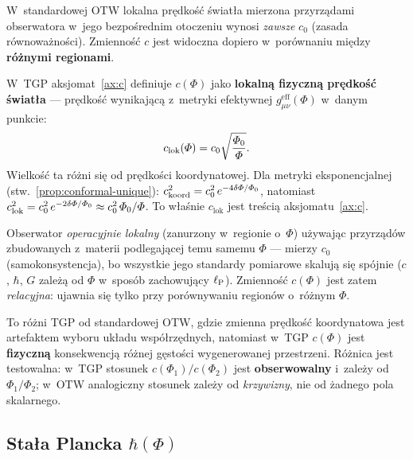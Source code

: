 \begin{remark}\label{rem:c-interpretacja}
W~standardowej OTW lokalna pr\k{e}dko\'s\'c \'swiat\l{}a
mierzona przyrz\k{a}dami obserwatora w~jego bezpo\'srednim
otoczeniu wynosi \emph{zawsze} $c_0$ (zasada r\'ownowa\.zno\'sci).
Zmienno\'s\'c $c$ jest widoczna dopiero w~por\'ownaniu
mi\k{e}dzy \textbf{r\'o\.znymi regionami}.

W~TGP aksjomat~\ref{ax:c} definiuje $c(\Phi)$ jako
\textbf{lokaln\k{a} fizyczn\k{a} pr\k{e}dko\'s\'c \'swiat\l{}a}
--- pr\k{e}dko\'s\'c wynikaj\k{a}c\k{a} z~metryki efektywnej
$g_{\mu\nu}^{\mathrm{eff}}(\Phi)$ w~danym punkcie:
\begin{equation}\label{eq:c-lok}
    c_{\mathrm{lok}}(\varPhi)
    = c_0\sqrt{\frac{\varPhi_0}{\varPhi}}.
\end{equation}
Wielko\'s\'c ta r\'o\.zni si\k{e} od pr\k{e}dko\'sci
koordynatowej. Dla metryki eksponencjalnej
(stw.~\ref{prop:conformal-unique}):
$c_{\mathrm{koord}}^2 = c_0^2\,e^{-4\delta\varPhi/\varPhi_0}$,
natomiast $c_{\mathrm{lok}}^2 = c_0^2\,e^{-2\delta\varPhi/\varPhi_0}
\approx c_0^2\,\varPhi_0/\varPhi$.
To w\l{}a\'snie $c_{\mathrm{lok}}$ jest tre\'sci\k{a}
aksjomatu~\ref{ax:c}.

Obserwator \emph{operacyjnie lokalny} (zanurzony w~regionie o~$\Phi$)
u\.zywaj\k{a}c przyrz\k{a}d\'ow zbudowanych z~materii
podlegaj\k{a}cej temu samemu $\Phi$ --- mierzy $c_0$
(samokonsystencja), bo wszystkie jego standardy pomiarowe
skaluj\k{a} si\k{e} sp\'ojnie ($c$, $\hbar$, $G$ zale\.z\k{a}
od $\Phi$ w~spos\'ob zachowuj\k{a}cy $\ell_{\mathrm{P}}$).
Zmienno\'s\'c $c(\Phi)$ jest zatem
\emph{relacyjna}: ujawnia si\k{e} tylko przy por\'ownywaniu
region\'ow o~r\'o\.znym $\Phi$.

To r\'o\.zni TGP od standardowej OTW, gdzie zmienna
pr\k{e}dko\'s\'c koordynatowa jest artefaktem wyboru
uk\l{}adu wsp\'o\l{}rz\k{e}dnych, natomiast w~TGP $c(\Phi)$ jest
\textbf{fizyczn\k{a}} konsekwencj\k{a} r\'o\.znej
g\k{e}sto\'sci wygenerowanej przestrzeni. R\'o\.znica
jest testowalna: w~TGP stosunek $c(\Phi_1)/c(\Phi_2)$
jest \textbf{obserwowalny} i~zale\.zy od $\Phi_1/\Phi_2$;
w~OTW analogiczny stosunek zale\.zy od \emph{krzywizny},
nie od \.zadnego pola skalarnego.
\end{remark}

\subsection{Sta\l{}a Plancka $\hbar(\Phi)$}\label{ssec:hbar}

